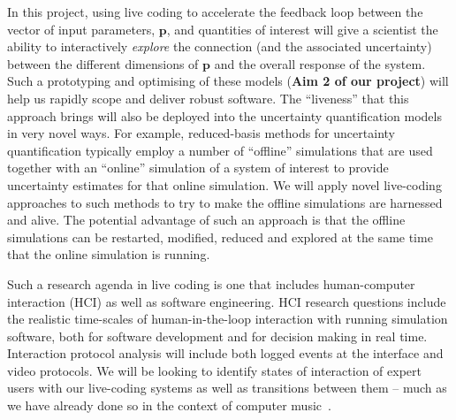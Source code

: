In this project, using live coding to accelerate the feedback loop between the vector of input parameters,
$\mathbf{p}$,  and quantities of interest  will give a scientist the ability to interactively
\emph{explore} the connection (and the associated uncertainty) between
the different dimensions of $\mathbf{p}$ and the overall response of
the system. Such a prototyping and optimising of these models ({\bf Aim 2 of our project}) will help us rapidly scope and deliver 
robust software. The ``liveness'' that this approach brings will also be deployed 
into the uncertainty quantification models in very novel ways. For example, reduced-basis methods for uncertainty 
quantification typically employ a number of ``offline'' simulations that are used together with an ``online'' simulation of 
a system of interest to provide uncertainty estimates for that online simulation. We will apply novel live-coding
approaches to such methods to try to make the offline simulations are harnessed and alive. The 
potential advantage of such an approach is that the offline simulations can be restarted, modified, reduced and 
explored at the same time that the online simulation is running.


Such a research agenda in live coding is one that 
includes human-computer interaction (HCI) as well as software engineering. HCI research questions include the realistic time-scales of 
human-in-the-loop interaction with running simulation software, both for software development and for decision making in real time.
Interaction protocol analysis will include both logged events at the interface and 
video protocols. We will be looking to identify states of interaction 
of expert users with our live-coding systems as well as transitions between them -- much as we have already done so in the 
context of computer music~\parencite{swift2014coding}.\\







